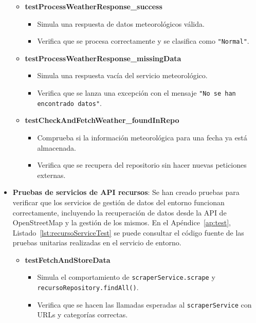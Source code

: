 \begin{itemize}
\begin{itemize}
  \item \textbf{testProcessWeatherResponse\_success}
  \begin{itemize}
    \item Simula una respuesta de datos meteorológicos válida.
    \item Verifica que se procesa correctamente y se clasifica como \texttt{"Normal"}.
  \end{itemize}

  \item \textbf{testProcessWeatherResponse\_missingData}
  \begin{itemize}
    \item Simula una respuesta vacía del servicio meteorológico.
    \item Verifica que se lanza una excepción con el mensaje \texttt{"No se han encontrado datos"}.
  \end{itemize}

  \item \textbf{testCheckAndFetchWeather\_foundInRepo}
  \begin{itemize}
    \item Comprueba si la información meteorológica para una fecha ya está almacenada.
    \item Verifica que se recupera del repositorio sin hacer nuevas peticiones externas.
  \end{itemize}
\end{itemize}

    \item \textbf{Pruebas de servicios de API recursos}: Se han creado pruebas para verificar que los servicios de gestión de datos del entorno funcionan correctamente, incluyendo la recuperación de datos desde la API de OpenStreetMap y la gestión de los mismos. En el Apéndice~\ref{ap:test}, Listado~\ref{lst:recursoServiceTest} se puede consultar el código fuente de las pruebas unitarias realizadas en el servicio de entorno.
    \begin{itemize}
  \item \textbf{testFetchAndStoreData}
  \begin{itemize}
    \item Simula el comportamiento de \texttt{scraperService.scrape} y \texttt{recursoRepository.findAll()}.
    \item Verifica que se hacen las llamadas esperadas al \texttt{scraperService} con URLs y categorías correctas.
  \end{itemize}


\end{itemize}
\end{itemize}
